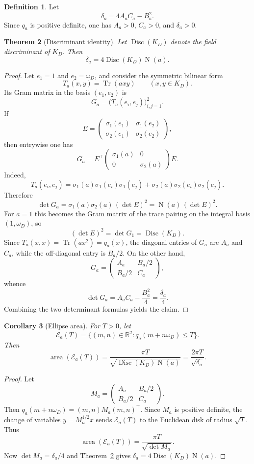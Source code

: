 \documentclass[manuscript]{acmart}
\theoremstyle{plain}
\newtheorem{theorem}{Theorem}[section]
\newtheorem{corollary}[theorem]{Corollary}
\theoremstyle{definition}
\newtheorem{definition}[theorem]{Definition}
\theoremstyle{nonitalicremark}
\newcommand{\R}{\mathbb{R}}
\newcommand{\Tr}{\operatorname{Tr}}
\newcommand{\N}{\operatorname{N}}
\newcommand{\Disc}{\operatorname{Disc}}
\newcommand{\cE}{\mathcal{E}}
\begin{document}
\begin{definition}
Let
\[
\delta_a = 4A_aC_a-B_a^2.
\]
Since $q_a$ is positive definite, one has $A_a>0$, $C_a>0$, and $\delta_a>0$.
\end{definition}

\begin{theorem}[Discriminant identity]\label{thm:disc-id}
Let $\Disc(K_D)$ denote the field discriminant of $K_D$. Then
\[
\delta_a = 4\Disc(K_D)\N(a).
\]
\end{theorem}

\begin{proof}
Let $e_1=1$ and $e_2=\omega_D$, and consider the symmetric bilinear form
\[
T_a(x,y)=\Tr(a x y)
\qquad (x,y\in K_D).
\]
Its Gram matrix in the basis $(e_1,e_2)$ is
\[
G_a = \bigl(T_a(e_i,e_j)\bigr)_{i,j=1}^2.
\]
If
\[
E=\begin{pmatrix}
\sigma_1(e_1) & \sigma_1(e_2)\\
\sigma_2(e_1) & \sigma_2(e_2)
\end{pmatrix},
\]
then entrywise one has
\[
G_a = E^{\top}
\begin{pmatrix}
\sigma_1(a) & 0\\ 0 & \sigma_2(a)
\end{pmatrix}
E.
\]
Indeed,
\[
T_a(e_i,e_j)=\sigma_1(a)\sigma_1(e_i)\sigma_1(e_j)+\sigma_2(a)\sigma_2(e_i)\sigma_2(e_j).
\]
Therefore
\[
\det G_a = \sigma_1(a)\sigma_2(a)\, (\det E)^2 = \N(a)\,(\det E)^2.
\]
For $a=1$ this becomes the Gram matrix of the trace pairing on the integral basis $(1,\omega_D)$, so
\[
(\det E)^2 = \det G_1 = \Disc(K_D).
\]
Since $T_a(x,x)=\Tr(a x^2)=q_a(x)$, the diagonal entries of $G_a$ are $A_a$ and $C_a$, while the
off-diagonal entry is $B_a/2$. On the other hand,
\[
G_a = \begin{pmatrix}
A_a & B_a/2\\ B_a/2 & C_a
\end{pmatrix},
\]
whence
\[
\det G_a = A_aC_a-\frac{B_a^2}{4}=\frac{\delta_a}{4}.
\]
Combining the two determinant formulas yields the claim.
\end{proof}

\begin{corollary}[Ellipse area]\label{cor:ellipse-area}
For $T>0$, let
\[
\cE_a(T)=\{(m,n)\in\R^2 : q_a(m+n\omega_D)\le T\}.
\]
Then
\[
\operatorname{area}(\cE_a(T)) = \frac{\pi T}{\sqrt{\Disc(K_D)\N(a)}} = \frac{2\pi T}{\sqrt{\delta_a}}.
\]
\end{corollary}

\begin{proof}
Let
\[
M_a=\begin{pmatrix}A_a & B_a/2\\ B_a/2 & C_a\end{pmatrix}.
\]
Then $q_a(m+n\omega_D)=(m,n)M_a(m,n)^{\top}$. Since $M_a$ is positive definite, the change of
variables $y=M_a^{1/2}x$ sends $\cE_a(T)$ to the Euclidean disk of radius $\sqrt T$. Thus
\[
\operatorname{area}(\cE_a(T)) = \frac{\pi T}{\sqrt{\det M_a}}.
\]
Now $\det M_a=\delta_a/4$ and Theorem~\ref{thm:disc-id} gives $\delta_a=4\Disc(K_D)\N(a)$.
\end{proof}
\end{document}
